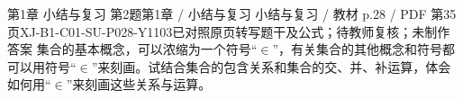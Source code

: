 \par\noindent\begin{minipage}{\linewidth}
\begin{bankitem}{第1章 小结与复习 第2题}{第1章 / 小结与复习 小结与复习 / 教材 p.28 / PDF 第35页}{XJ-B1-C01-SU-P028-Y1103}{已对照原页转写题干及公式；待教师复核；未制作答案}
集合的基本概念，可以浓缩为一个符号“$\in$”，有关集合的其他概念和符号都可以用符号“$\in$”来刻画。试结合集合的包含关系和集合的交、并、补运算，体会如何用“$\in$”来刻画这些关系与运算。
\end{bankitem}
\end{minipage}\par\medskip
